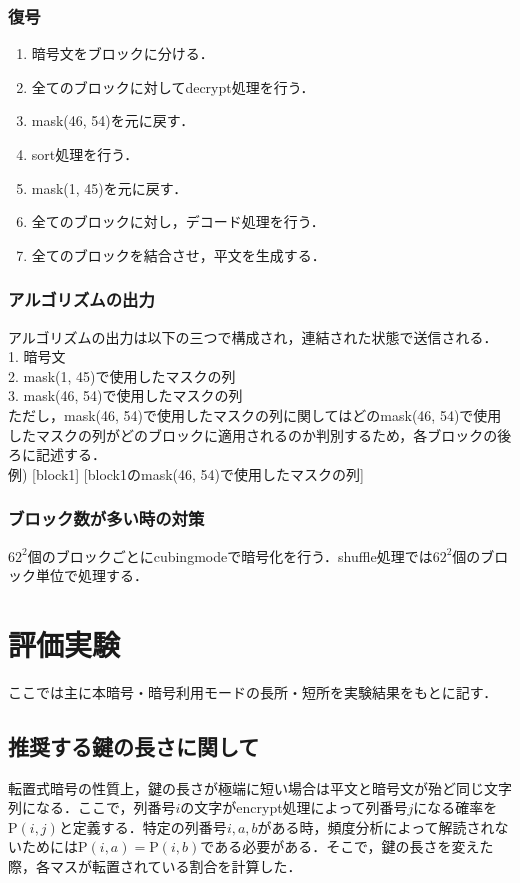 \documentclass[titlepage]{jarticle}
\begin{document}
\subsubsection{復号}
\begin{enumerate}
\item 暗号文をブロックに分ける．
\item 全てのブロックに対してdecrypt処理を行う．
\item mask(46, 54)を元に戻す．
\item sort処理を行う．
\item mask(1, 45)を元に戻す．
\item 全てのブロックに対し，デコード処理を行う．
\item 全てのブロックを結合させ，平文を生成する．
\end{enumerate}

\subsubsection{アルゴリズムの出力}
アルゴリズムの出力は以下の三つで構成され，連結された状態で送信される．\\
1. 暗号文\\
2. mask(1, 45)で使用したマスクの列\\
3. mask(46, 54)で使用したマスクの列\\
ただし，mask(46, 54)で使用したマスクの列に関してはどのmask(46, 54)で使用したマスクの列がどのブロックに適用されるのか判別するため，各ブロックの後ろに記述する．\\
例) [block1] [block1のmask(46, 54)で使用したマスクの列] 

\subsubsection{ブロック数が多い時の対策}
\(62^2\)個のブロックごとにcubingmodeで暗号化を行う．shuffle処理では\(62^2\)個のブロック単位で処理する．

\section{評価実験}
ここでは主に本暗号・暗号利用モードの長所・短所を実験結果をもとに記す．
\subsection{推奨する鍵の長さに関して}
転置式暗号の性質上，鍵の長さが極端に短い場合は平文と暗号文が殆ど同じ文字列になる．ここで，列番号\(i\)の文字がencrypt処理によって列番号\(j\)になる確率を\(\mathrm{P}(i,j)\)と定義する．特定の列番号\(i,a,b\)がある時，頻度分析によって解読されないためには\(\mathrm{P}(i,a)=\mathrm{P}(i,b)\)である必要がある．そこで，鍵の長さを変えた際，各マスが転置されている割合を計算した．\\
\end{document}
